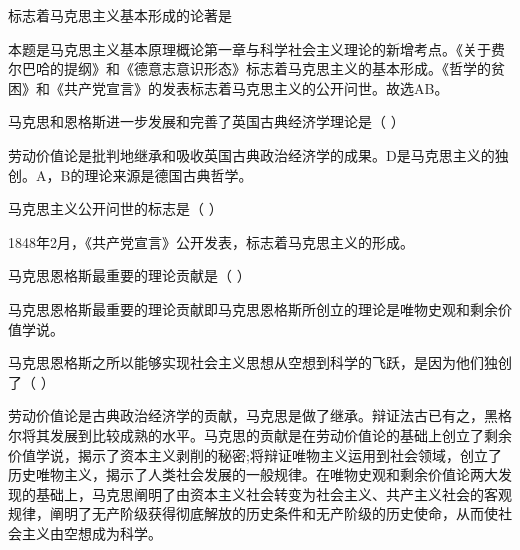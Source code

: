 \question 标志着马克思主义基本形成的论著是
\par{}
\begin{solution}本题是马克思主义基本原理概论第一章与科学社会主义理论的新增考点。《关于费尔巴哈的提纲》和《德意志意识形态》标志着马克思主义的基本形成。《哲学的贫困》和《共产党宣言》的发表标志着马克思主义的公开问世。故选AB。
\end{solution}
\question 马克思和恩格斯进一步发展和完善了英国古典经济学理论是（ ）
\par{}
\begin{solution}劳动价值论是批判地继承和吸收英国古典政治经济学的成果。D是马克思主义的独创。A，B的理论来源是德国古典哲学。
\end{solution}
\question 马克思主义公开问世的标志是（ ）
\par{}
\begin{solution}1848年2月，《共产党宣言》公开发表，标志着马克思主义的形成。
\end{solution}
\question 马克思恩格斯最重要的理论贡献是（ ）
\par{}
\begin{solution}马克思恩格斯最重要的理论贡献即马克思恩格斯所创立的理论是唯物史观和剩余价值学说。
\end{solution}
\question 马克思恩格斯之所以能够实现社会主义思想从空想到科学的飞跃，是因为他们独创了（
）
\par{}
\begin{solution}劳动价值论是古典政治经济学的贡献，马克思是做了继承。辩证法古已有之，黑格尔将其发展到比较成熟的水平。马克思的贡献是在劳动价值论的基础上创立了剩余价值学说，揭示了资本主义剥削的秘密;将辩证唯物主义运用到社会领域，创立了历史唯物主义，揭示了人类社会发展的一般规律。在唯物史观和剩余价值论两大发现的基础上，马克思阐明了由资本主义社会转变为社会主义、共产主义社会的客观规律，阐明了无产阶级获得彻底解放的历史条件和无产阶级的历史使命，从而使社会主义由空想成为科学。
\end{solution}
